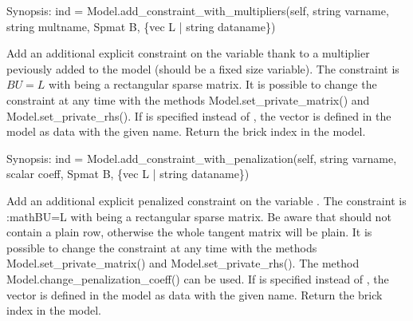 \documentclass[a4paper,11pt,english]{sphinxmanual}
\begin{document}
\begin{fulllineitems}
\begin{fulllineitems}
\end{fulllineitems}


\begin{fulllineitems}
\label{\detokenize{python/cmdref_Model:getfem.Model.add_constraint_with_multipliers}}
Synopsis: ind = Model.add\_constraint\_with\_multipliers(self, string varname, string multname, Spmat B, \{vec L | string dataname\})

Add an additional explicit constraint on the variable  thank to
a multiplier  peviously added to the model (should be a fixed
size variable). The constraint is \(BU=L\)
with  being a rectangular sparse matrix. It is possible to change
the constraint at any time with the methods Model.set\_private\_matrix()
and Model.set\_private\_rhs(). If  is specified instead of ,
the vector  is defined in the model as data with the given name.
Return the brick index in the model.

\end{fulllineitems}


\begin{fulllineitems}
\label{\detokenize{python/cmdref_Model:getfem.Model.add_constraint_with_penalization}}
Synopsis: ind = Model.add\_constraint\_with\_penalization(self, string varname, scalar coeff, Spmat B, \{vec L | string dataname\})

Add an additional explicit penalized constraint on the variable .
The constraint is :math\textasciigrave{}BU=L\textasciigrave{} with  being a rectangular sparse matrix.
Be aware that  should not contain a plain row, otherwise the whole
tangent matrix will be plain. It is possible to change the constraint
at any time with the methods Model.set\_private\_matrix()
and Model.set\_private\_rhs(). The method
Model.change\_penalization\_coeff() can be used.
If  is specified instead of , the vector  is defined
in the model as data with the given name.
Return the brick
index in the model.


\end{fulllineitems}
\end{fulllineitems}
\end{document}
